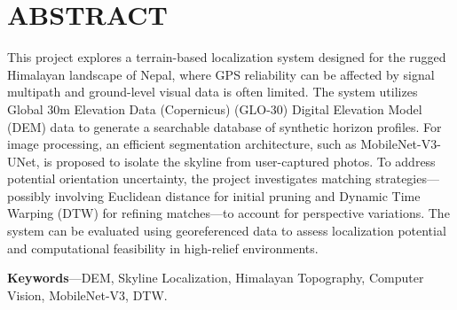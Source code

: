 

\chapter*{ABSTRACT}
{}


\bigskip

This project explores a terrain-based localization system designed for the rugged Himalayan landscape of Nepal, where GPS reliability can be affected by signal multipath and ground-level visual data is often limited. The system utilizes Global 30m Elevation Data (Copernicus) (GLO-30) Digital Elevation Model (DEM) data to generate a searchable database of synthetic horizon profiles. For image processing, an efficient segmentation architecture, such as MobileNet-V3-UNet, is proposed to isolate the skyline from user-captured photos. To address potential orientation uncertainty, the project investigates matching strategies—possibly involving Euclidean distance for initial pruning and Dynamic Time Warping (DTW) for refining matches—to account for perspective variations. The system can be evaluated using georeferenced data to assess localization potential and computational feasibility in high-relief environments.

\vspace{1cm}
\noindent \textbf{Keywords}---DEM, Skyline Localization, Himalayan Topography, Computer Vision, MobileNet-V3, DTW.
